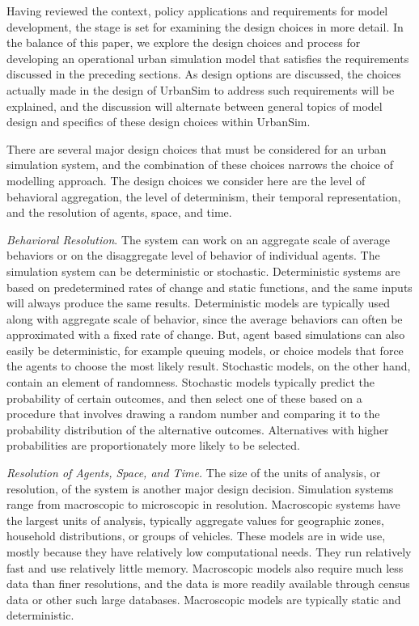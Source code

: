 Having reviewed the context, policy applications and requirements for model development, the stage is set for examining the design choices in more detail.  In the balance of this paper, we explore the design choices and process for developing an operational urban simulation model that satisfies the requirements discussed in the preceding sections.  As design options are discussed, the choices actually made in the design of UrbanSim to address such requirements will be explained, and the discussion will alternate between general topics of model design and specifics of these design choices within UrbanSim.

There are several major design choices that must be considered for an urban simulation system, and the combination of these choices narrows the choice of modelling approach.  The design choices we consider here are the level of behavioral aggregation, the level of determinism, their temporal representation, and the resolution of agents, space, and time.

\emph{Behavioral Resolution}.  The system can work on an aggregate scale of average behaviors or on the disaggregate level of behavior of individual agents. The simulation system can be deterministic or stochastic. Deterministic systems are based on predetermined rates of change and static functions, and the same inputs will always produce the same results. Deterministic models are typically used along with aggregate scale of behavior, since the average behaviors can often be approximated with a fixed rate of change.  But, agent based simulations can also easily be deterministic, for example queuing models, or choice models that force the agents to choose the most likely result.  Stochastic models, on the other hand, contain an element of randomness. Stochastic models typically predict the probability of certain outcomes, and then select one of these based on a procedure that involves drawing a random number and comparing it to the probability distribution of the alternative outcomes.  Alternatives with higher probabilities are proportionately more likely to be selected.

\emph{Resolution of Agents, Space, and Time.}  The size of the units of analysis, or resolution, of the system is another major design decision. Simulation systems range from macroscopic to microscopic in resolution. Macroscopic systems have the largest units of analysis, typically aggregate values for geographic zones, household distributions, or groups of vehicles. These models are in wide use, mostly because they have relatively low computational needs. They run relatively fast and use relatively little memory. Macroscopic models also require much less data than finer resolutions, and the data is more readily available through census data or other such large databases. Macroscopic models are typically static and deterministic.

